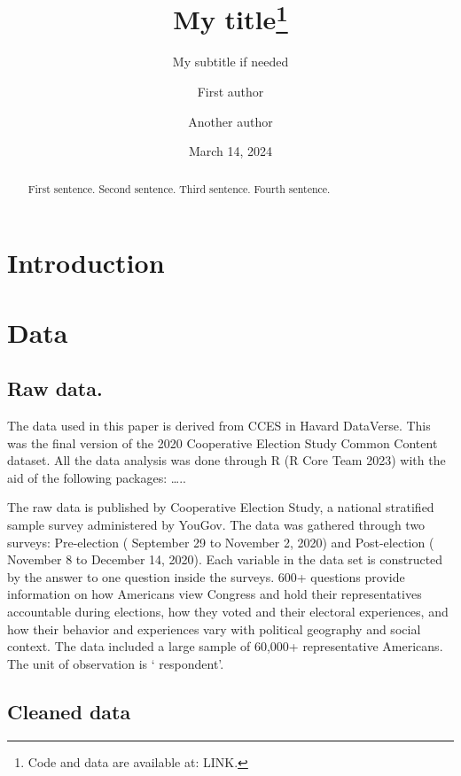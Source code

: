 \documentclass[
  letterpaper,
  DIV=11,
  numbers=noendperiod]{scrartcl}
\title{My title\thanks{Code and data are available at: LINK.}}
\subtitle{My subtitle if needed}
\author{First author \and Another author}
\date{March 14, 2024}
\begin{document}
\maketitle
\begin{abstract}
First sentence. Second sentence. Third sentence. Fourth sentence.
\end{abstract}
\ifdefined\Shaded\renewenvironment{Shaded}{\begin{tcolorbox}[sharp corners, interior hidden, boxrule=0pt, frame hidden, enhanced, breakable, borderline west={3pt}{0pt}{shadecolor}]}{\end{tcolorbox}}\fi

\hypertarget{introduction}{%
\section{Introduction}\label{introduction}}

\hypertarget{sec-data}{%
\section{Data}\label{sec-data}}

\hypertarget{raw-data.}{%
\subsection{Raw data.}\label{raw-data.}}

The data used in this paper is derived from CCES in Havard DataVerse.
This was the final version of the 2020 Cooperative Election Study Common
Content dataset. All the data analysis was done through R (R Core Team
2023) with the aid of the following packages: \ldots..

The raw data is published by Cooperative Election Study, a national
stratified sample survey administered by YouGov. The data was gathered
through two surveys: Pre-election ( September 29 to November 2, 2020)
and Post-election ( November 8 to December 14, 2020). Each variable in
the data set is constructed by the answer to one question inside the
surveys. 600+ questions provide information on how Americans view
Congress and hold their representatives accountable during elections,
how they voted and their electoral experiences, and how their behavior
and experiences vary with political geography and social context. The
data included a large sample of 60,000+ representative Americans. The
unit of observation is ` respondent'.

\hypertarget{cleaned-data}{%
\subsection{Cleaned data}\label{cleaned-data}}
\end{document}
